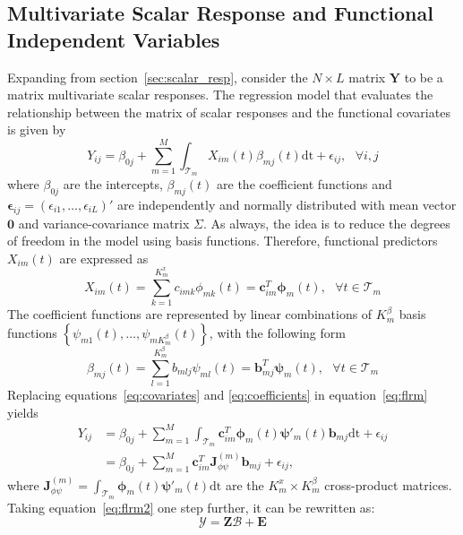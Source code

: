 \subsection{Multivariate Scalar Response and Functional Independent Variables}
Expanding from section~\ref{sec:scalar_resp}, consider the $N \times L$ matrix $\bm{Y}$ to be a matrix multivariate scalar responses. The regression model that evaluates the relationship between the matrix of scalar responses and the functional covariates is given by
\begin{equation}\label{eq:flrm}
Y_{ij} = \beta_{0 j} + \sum_{m=1}^{M} \int_{\mathcal{T}_m} X_{i m}(t) \beta_{m j}(t)\mathrm{dt} + \epsilon_{ij}, \text{ } \forall i, j
\end{equation}
where $\beta_{0 j}$ are the intercepts, $\beta_{m j}(t)$ are the coefficient functions and $\bm{\epsilon}_{ij} = \left(\epsilon_{i1},\dots,\epsilon_{iL} \right)'$ are independently and normally distributed with mean vector $\bm{0}$ and variance-covariance matrix $\Sigma$. As always, the idea is to reduce the degrees of freedom in the model using basis functions. Therefore, functional predictors $X_{i m}(t)$ are expressed as
\begin{equation}\label{eq:covariates}
X_{i m}(t) = \sum_{k=1}^{K_m^{x}} c_{i m k} \phi_{m k} (t) = \bm{c}_{i m}^T \bm{\phi}_{m}(t),\text{ } \forall t \in \mathcal{T}_m
\end{equation}
The coefficient functions are represented by linear combinations of $K_m^{\beta}$ basis functions $\left\{\psi_{m 1}(t),\dots,\psi_{m K_m^{\beta}}(t) \right\}$, with the following form
\begin{equation}\label{eq:coefficients}
\beta_{m j}(t) = \sum_{l=1}^{K_m^{\beta}} b_{m l j}\psi_{m l}(t) = \bm{b}_{m j}^T \bm{\psi}_m(t),\text{ } \forall t \in \mathcal{T}_m
\end{equation}
Replacing equations~\eqref{eq:covariates} and \eqref{eq:coefficients} in equation~\eqref{eq:flrm} yields
\begin{align}\label{eq:flrm2}
Y_{i j} &= \beta_{0 j} + \sum_{m=1}^{M} \int_{\mathcal{T}_m} \bm{c}_{i m}^T \bm{\phi}_{m}(t)\bm{\psi}'_m(t)\bm{b}_{m j}\mathrm{dt} + \epsilon_{ij} \nonumber \\
&= \beta_{0 j} + \sum_{m=1}^{M} \bm{c}_{i m}^T \bm{J}_{\phi \psi}^{(m)}\bm{b}_{m j} + \epsilon_{i j},
\end{align}
where $\bm{J}_{\phi \psi}^{(m)} = \int_{\mathcal{T}_m} \bm{\phi}_{m}(t)\bm{\psi}'_m(t)\mathrm{dt}$ are the $K_m^{x} \times K_m^{\beta}$ cross-product matrices. Taking equation~\eqref{eq:flrm2} one step further, it can be rewritten as:
\begin{equation}\label{multivar_flrm}
\bm{\mathcal{Y}} = \bm{Z}\bm{\mathcal{B}} + \bm{E} 
\end{equation}

